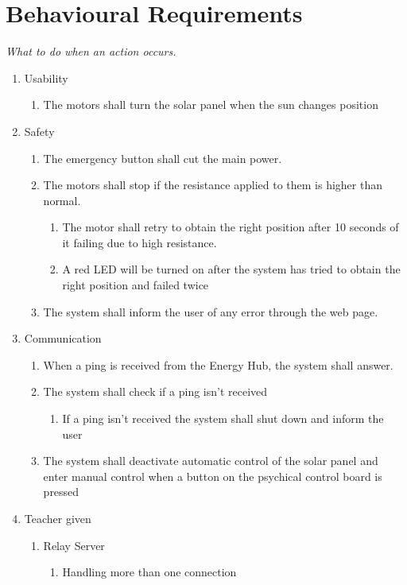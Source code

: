 \documentclass[12pt,a4paper]{report}
\begin{document}
\section{Behavioural Requirements}
\textit{What to do when an action occurs.}
\begin{enumerate}
\item	Usability 
\begin{enumerate}
	\item	The motors shall turn the solar panel when the sun changes position
\end{enumerate}
\item	Safety
\begin{enumerate}
	\item	The emergency button shall cut the main power.
	\item	The motors shall stop if the resistance applied to them is higher than normal.
	\begin{enumerate}
		\item	The motor shall retry to obtain the right position after 10 seconds of it failing due to high resistance.
		\item	A red LED will be turned on after the system has tried to obtain the right position and failed twice
	\end{enumerate}
	\item	The system shall inform the user of any error through the web page.
\end{enumerate}
\item	Communication
\begin{enumerate}
	\item	When a ping is received from the Energy Hub, the system shall answer.
	\item	The system shall check if a ping isn't received
	\begin{enumerate}
		\item	If a ping isn't received the system shall shut down and inform the user
	\end{enumerate}
	\item	The system shall deactivate automatic control of the solar panel and enter manual control when a button on the psychical control board is pressed
\end{enumerate}
\item Teacher given
\begin{enumerate}
	\item Relay Server
	\begin{enumerate}
		\item Handling more than one connection

\end{enumerate}
\end{enumerate}
\end{enumerate}
\end{document}
